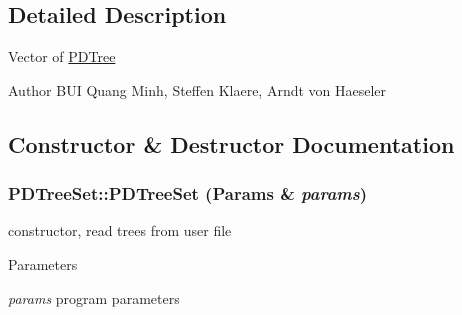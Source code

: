 \subsection{Detailed Description}
Vector of \hyperlink{classPDTree}{PDTree}

\begin{DoxyAuthor}{Author}
BUI Quang Minh, Steffen Klaere, Arndt von Haeseler 
\end{DoxyAuthor}


\subsection{Constructor \& Destructor Documentation}
\hypertarget{classPDTreeSet_a168d632f3e858ba8e8c714e8ab85fa45}{
\subsubsection[{PDTreeSet}]{\setlength{\rightskip}{0pt plus 5cm}PDTreeSet::PDTreeSet ({\bf Params} \& {\em params})}}
\label{classPDTreeSet_a168d632f3e858ba8e8c714e8ab85fa45}
constructor, read trees from user file 
\begin{DoxyParams}{Parameters}
\item[{\em params}]program parameters \end{DoxyParams}


